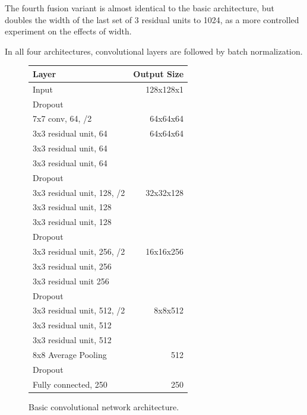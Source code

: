 \documentclass[10pt,twocolumn,letterpaper]{article}
\begin{document}
The fourth fusion variant is almost identical to the basic architecture, but doubles the width of the last set of 3 residual units to 1024, as a more controlled experiment on the effects of width.

In all four architectures, convolutional layers are followed by batch normalization.

\begin{figure}[h]
\begin{center}
\begin{tabular}{l | r}
Layer & Output Size \\ \hline \hline
Input	& 128x128x1\\
Dropout &  \\
7x7 conv, 64, /2	 & 64x64x64\\
3x3 residual unit, 64	& 64x64x64\\
3x3 residual unit, 64 & \\
3x3 residual unit, 64	& \\
Dropout	&  \\
3x3 residual unit, 128, /2 & 32x32x128\\
3x3 residual unit, 128 & \\
3x3 residual unit, 128 &\\
Dropout & \\
3x3 residual unit, 256, /2 & 16x16x256\\
3x3 residual unit, 256 & \\
3x3 residual unit 256	 & \\
Dropout	& \\
3x3 residual unit, 512, /2	& 8x8x512\\
3x3 residual unit, 512	&\\
3x3 residual unit, 512& \\
8x8 Average Pooling	& 512\\
Dropout& 	\\
Fully connected, 250	& 250
\end{tabular}
\caption{Basic convolutional network architecture.}
\end{center}
\end{figure}
\end{document}
